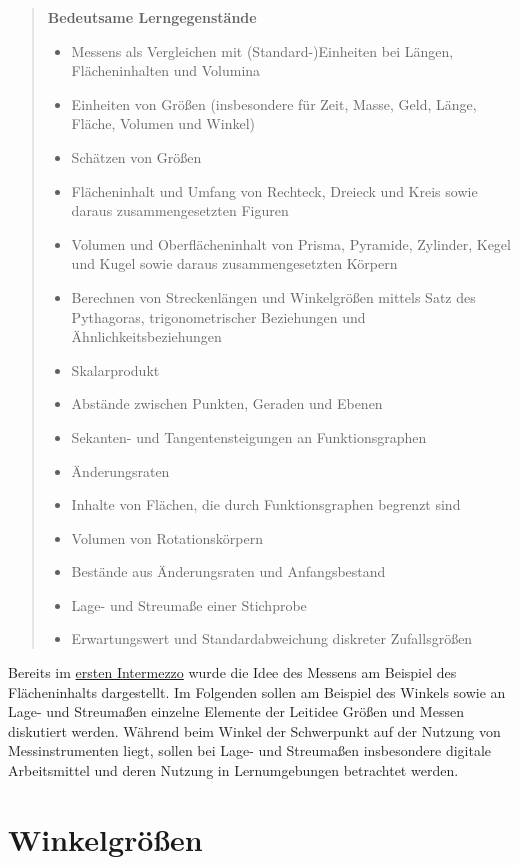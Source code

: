 \documentclass[
]{scrbook}
\providecommand{\tightlist}{%
  \setlength{\itemsep}{0pt}\setlength{\parskip}{0pt}}
\theoremstyle{definition}
\theoremstyle{definition}
\theoremstyle{definition}
\theoremstyle{definition}
\theoremstyle{remark}
\begin{document}
\begin{quote}
\textbf{Bedeutsame Lerngegenstände}

\begin{itemize}
\tightlist
\item
  Messens als Vergleichen mit (Standard-)Einheiten bei Längen, Flächeninhalten und Volumina
\item
  Einheiten von Größen (insbesondere für Zeit, Masse, Geld, Länge, Fläche, Volumen und Winkel)
\item
  Schätzen von Größen
\item
  Flächeninhalt und Umfang von Rechteck, Dreieck und Kreis sowie daraus zusammengesetzten Figuren
\item
  Volumen und Oberflächeninhalt von Prisma, Pyramide, Zylinder, Kegel und Kugel sowie daraus zusammengesetzten Körpern
\item
  Berechnen von Streckenlängen und Winkelgrößen mittels Satz des Pythagoras, trigonometrischer Beziehungen und Ähnlichkeitsbeziehungen
\item
  Skalarprodukt
\item
  Abstände zwischen Punkten, Geraden und Ebenen
\item
  Sekanten- und Tangentensteigungen an Funktionsgraphen
\item
  Änderungsraten
\item
  Inhalte von Flächen, die durch Funktionsgraphen begrenzt sind
\item
  Volumen von Rotationskörpern
\item
  Bestände aus Änderungsraten und Anfangsbestand
\item
  Lage- und Streumaße einer Stichprobe
\item
  Erwartungswert und Standardabweichung diskreter Zufallsgrößen
\end{itemize}
\end{quote}

Bereits im \protect\hyperlink{erstes-intermezzo-flaecheninhalt}{ersten Intermezzo} wurde die Idee des Messens am Beispiel des Flächeninhalts dargestellt. Im Folgenden sollen am Beispiel des Winkels sowie an Lage- und Streumaßen einzelne Elemente der Leitidee Größen und Messen diskutiert werden. Während beim Winkel der Schwerpunkt auf der Nutzung von Messinstrumenten liegt, sollen bei Lage- und Streumaßen insbesondere digitale Arbeitsmittel und deren Nutzung in Lernumgebungen betrachtet werden.

\hypertarget{winkelgruxf6uxdfen}{%
\section{Winkelgrößen}\label{winkelgruxf6uxdfen}}
\end{document}
